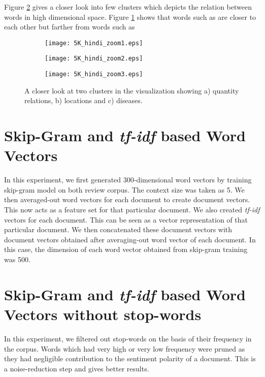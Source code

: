 Figure \ref{fig:5K_hindi_zoom} gives a closer look into few clusters which depicts the relation between words in high dimensional space. Figure \ref{fig:5K_hindi_zoom1} shows that words such as 
are closer to each other but farther from words such as 

\begin{figure}[ht!]
    \centering
    \begin{subfigure}{.4\linewidth}
        \texttt{[image: 5K\_hindi\_zoom1.eps]}
        \caption{}
        \label{fig:5K_hindi_zoom1}
    \end{subfigure}
    \newline
    \begin{subfigure}{.4\linewidth}
        \texttt{[image: 5K\_hindi\_zoom2.eps]}
        \caption{}
    \end{subfigure}
    \newline
    \begin{subfigure}{.4\linewidth}
        \texttt{[image: 5K\_hindi\_zoom3.eps]}
        \caption{}
    \end{subfigure}
    \caption{A closer look at two clusters in the visualization showing a) quantity relations, b) locations and c) diseases.}
    \label{fig:5K_hindi_zoom}
\end{figure}

\section{Skip-Gram and \emph{tf-idf} based Word Vectors}
In this experiment, we first generated 300-dimensional word vectors by training skip-gram model on both review corpus. The context size was taken as 5. We then averaged-out word vectors for each document to create document vectors. This now acts as a feature set for that particular document.
We also created \emph{tf-idf} vectors for each document. This can be seen as a vector representation of that particular document. We then concatenated these document vectors with document vectors obtained after averaging-out word vector of each document. In this case, the dimension of each word vector obtained from skip-gram training was 500.

\section{Skip-Gram and \emph{tf-idf} based Word Vectors without stop-words}
In this experiment, we filtered out stop-words on the basis of their frequency in the corpus. Words which had very high or very low frequency were pruned as they had negligible contribution to the sentiment polarity of a document. This is a noise-reduction step and gives better results.

